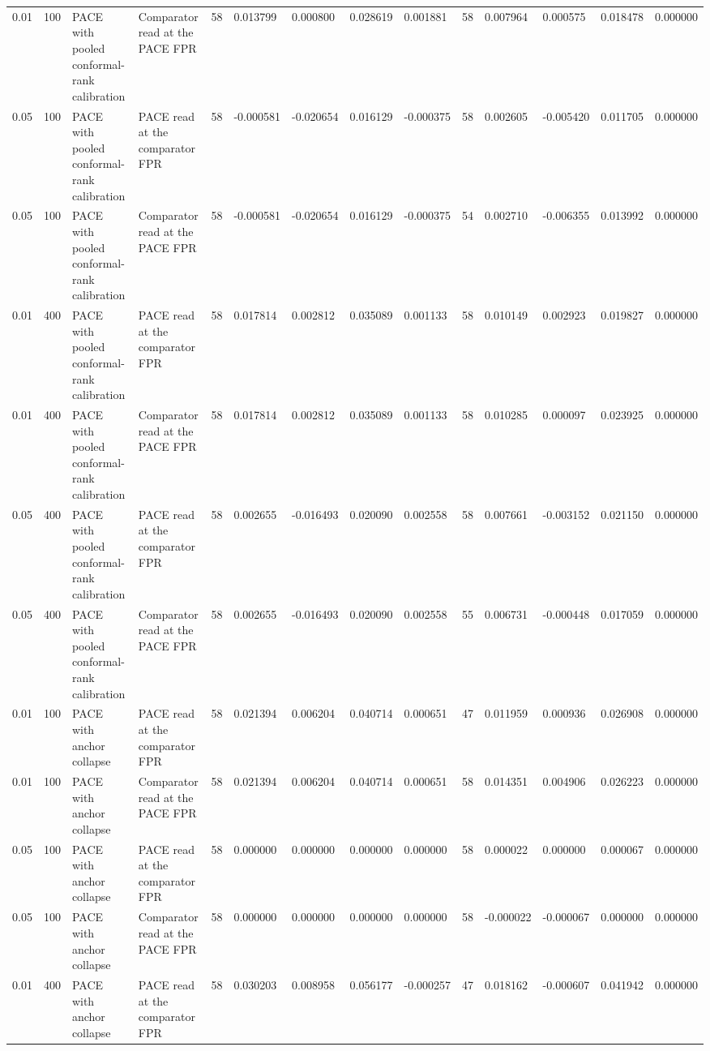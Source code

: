 \begin{tabular}{llllllllllllll}
0.01 & 100 & PACE with pooled conformal-rank calibration & Comparator read at the PACE FPR & 58 & 0.013799 & 0.000800 & 0.028619 & 0.001881 & 58 & 0.007964 & 0.000575 & 0.018478 & 0.000000 \\
0.05 & 100 & PACE with pooled conformal-rank calibration & PACE read at the comparator FPR & 58 & -0.000581 & -0.020654 & 0.016129 & -0.000375 & 58 & 0.002605 & -0.005420 & 0.011705 & 0.000000 \\
0.05 & 100 & PACE with pooled conformal-rank calibration & Comparator read at the PACE FPR & 58 & -0.000581 & -0.020654 & 0.016129 & -0.000375 & 54 & 0.002710 & -0.006355 & 0.013992 & 0.000000 \\
0.01 & 400 & PACE with pooled conformal-rank calibration & PACE read at the comparator FPR & 58 & 0.017814 & 0.002812 & 0.035089 & 0.001133 & 58 & 0.010149 & 0.002923 & 0.019827 & 0.000000 \\
0.01 & 400 & PACE with pooled conformal-rank calibration & Comparator read at the PACE FPR & 58 & 0.017814 & 0.002812 & 0.035089 & 0.001133 & 58 & 0.010285 & 0.000097 & 0.023925 & 0.000000 \\
0.05 & 400 & PACE with pooled conformal-rank calibration & PACE read at the comparator FPR & 58 & 0.002655 & -0.016493 & 0.020090 & 0.002558 & 58 & 0.007661 & -0.003152 & 0.021150 & 0.000000 \\
0.05 & 400 & PACE with pooled conformal-rank calibration & Comparator read at the PACE FPR & 58 & 0.002655 & -0.016493 & 0.020090 & 0.002558 & 55 & 0.006731 & -0.000448 & 0.017059 & 0.000000 \\
0.01 & 100 & PACE with anchor collapse & PACE read at the comparator FPR & 58 & 0.021394 & 0.006204 & 0.040714 & 0.000651 & 47 & 0.011959 & 0.000936 & 0.026908 & 0.000000 \\
0.01 & 100 & PACE with anchor collapse & Comparator read at the PACE FPR & 58 & 0.021394 & 0.006204 & 0.040714 & 0.000651 & 58 & 0.014351 & 0.004906 & 0.026223 & 0.000000 \\
0.05 & 100 & PACE with anchor collapse & PACE read at the comparator FPR & 58 & 0.000000 & 0.000000 & 0.000000 & 0.000000 & 58 & 0.000022 & 0.000000 & 0.000067 & 0.000000 \\
0.05 & 100 & PACE with anchor collapse & Comparator read at the PACE FPR & 58 & 0.000000 & 0.000000 & 0.000000 & 0.000000 & 58 & -0.000022 & -0.000067 & 0.000000 & 0.000000 \\
0.01 & 400 & PACE with anchor collapse & PACE read at the comparator FPR & 58 & 0.030203 & 0.008958 & 0.056177 & -0.000257 & 47 & 0.018162 & -0.000607 & 0.041942 & 0.000000 \\

\end{tabular}
